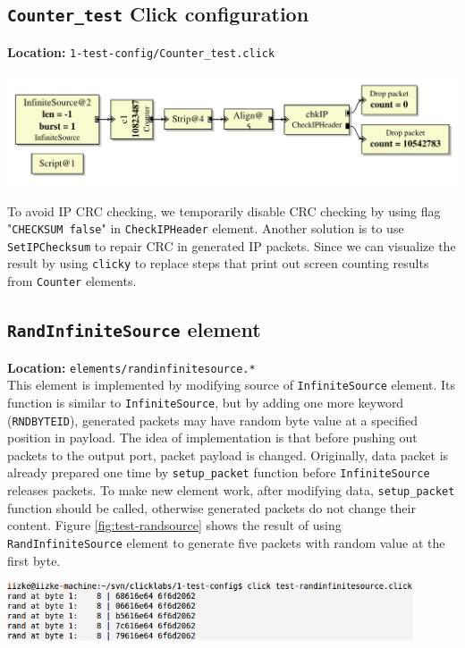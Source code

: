 \documentclass[a4paper]{article}
\begin{document}
  \subsection{\texttt{Counter\_test} Click configuration}
  \textbf{Location:} \texttt{1-test-config/Counter\_test.click} \\
  \begin{center}
	  \includegraphics[scale=0.6]{counter_test.pdf}
	  \label{fig:countertest}
  \end{center}
  To avoid IP CRC checking, we temporarily disable CRC checking by using flag "\texttt{CHECKSUM false}" in \texttt{CheckIPHeader} element. Another solution is to use \texttt{SetIPChecksum} to repair CRC in generated IP packets. Since we can visualize the result by using \texttt{clicky} to replace steps that print out screen counting results from \texttt{Counter} elements. 
  \subsection{\texttt{RandInfiniteSource} element}
  \textbf{Location:} \texttt{elements/randinfinitesource.*} \\
  This element is implemented by modifying source of \texttt{InfiniteSource} element. Its function is similar to \texttt{InfiniteSource}, but by adding one more keyword (\texttt{RNDBYTEID}), generated packets may have random byte value at a specified position in payload. The idea of implementation is that before pushing out packets to the output port, packet payload is changed. Originally, data packet is already prepared one time by \texttt{setup\_packet} function before \texttt{InfiniteSource} releases packets. To make new element work, after modifying data, \texttt{setup\_packet} function should be called, otherwise generated packets do not change their content. Figure \ref{fig:test-randsource} shows the result of using \texttt{RandInfiniteSource} element to generate five packets with random value at the first byte.
  \begin{center}
	\includegraphics[width=0.9\textwidth]{test-randinfinitesource.png}
	\label{fig:test-randsource}
  \end{center}
\end{document}
